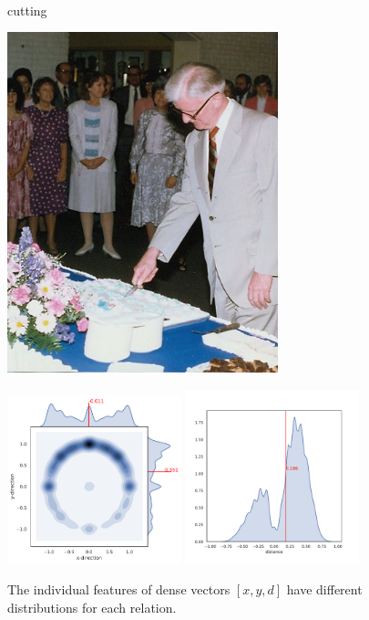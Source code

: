 \begin{figure}
\begin{minipage}{0.6\textwidth}
	\end{minipage}\\%
	\begin{minipage}{0.1\textwidth}
		\centering
		cutting
	\end{minipage}%
	\begin{minipage}{0.3\textwidth}
		\centering
		\includegraphics[width=0.7\textwidth]{studies/sc2020/figures/2384609_man_cutting_cake.jpg}
	\end{minipage}%
	\begin{minipage}{0.6\textwidth}
		\centering
		\includegraphics[width=0.45\textwidth]{studies/sc2020/figures/cutting_xy.pdf}
		\includegraphics[width=0.45\textwidth]{studies/sc2020/figures/cutting_d.pdf}
	\end{minipage}%
	\caption{The individual features of dense vectors $[x,y,d]$ have different distributions for each relation.} \label{sc2020:fig:features_dist} %
\end{figure}




